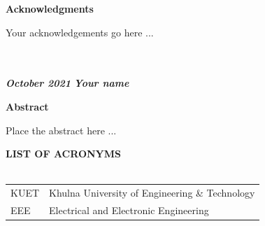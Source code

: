 \documentclass[a4paper,12pt,oneside]{book}
\newcommand{\blanklineR}{\hfill \\} %
\newcommand{\HeadingR}[1]{%
{\large			%
\bfseries{#1}}}
\begin{document}
\newpage
{} \label{ack}

\begin{center}
\HeadingR{Acknowledgments}
\end{center}
Your acknowledgements go here ...

\blanklineR \blanklineR
\textit{\textbf{October 2021}} \hfill \textit{\textbf{Your name}}

\newpage
{} \label{abstr}

\begin{center}
\HeadingR{Abstract}
\end{center}
Place the abstract here ...

\newpage
{}
\begin{singlespacing}
\tableofcontents
\end{singlespacing}
\newpage
{} \label{listoftab}
\listoftables
{}	%
\newpage
{} \label{listoffig}
\listoffigures
{}	%

\newpage
{} \label{abbrv}

\begin{center}
\HeadingR{\MakeUppercase{List of Acronyms}}
\blanklineR \blanklineR
\begin{longtable}{l@{\qquad}l}
KUET & Khulna University of Engineering \& Technology \\
EEE & Electrical and Electronic Engineering 
\end{longtable}
\end{center}

\mainmatter
{} %
\end{document}

